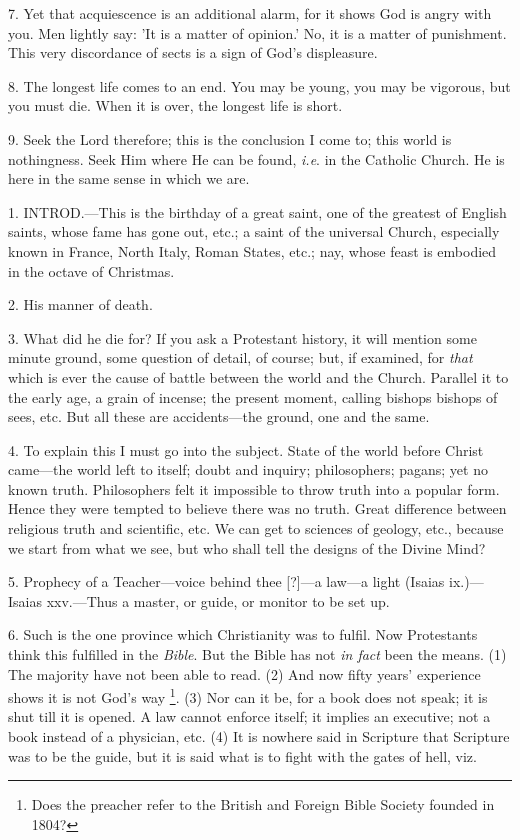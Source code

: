 7. Yet that acquiescence is an additional alarm,
for it shows God is angry with you. Men lightly say: 'It is a matter
of opinion.' No, it is a matter of punishment. This very discordance
of sects is a sign of God's displeasure.

8. The longest life comes to an end. You may be
young, you may be vigorous, but you must die. When it is over, the
longest life is short.

9. Seek the Lord therefore; this is the
conclusion I come to; this world is nothingness. Seek Him where He can
be found, \emph{i.e}. in the Catholic Church. He is here in the same
sense in which we are.


1. INTROD.—This
is the birthday of a great saint, one of the greatest of English
saints, whose fame has gone out, etc.; a saint of the universal
Church, especially known in France, North Italy, Roman States, etc.;
nay, whose feast is embodied in the octave of Christmas.

2. His manner of death.

3. What did he die for? If you ask a Protestant
history, it will mention some minute ground, some question of detail,
of course; but, if examined, for \emph{that} which is ever the cause
of battle between the world and the Church. Parallel it to the early
age, a grain of incense; the present moment, calling bishops bishops
of sees, etc. But all these are accidents—the ground, one and the
same.

4. To explain this I must go into the subject.
State of the world before Christ came—the world left to itself;
doubt and inquiry; philosophers; pagans; yet no known truth.
Philosophers felt it impossible to throw truth into a popular form.
Hence they were tempted to believe there was no truth. Great
difference between religious truth and scientific, etc. We can get to
sciences of geology, etc., because we start from what we see, but who
shall tell the designs of the Divine Mind?

5. Prophecy of a Teacher—voice behind thee
[?]—a law—a light (Isaias ix.)—Isaias xxv.—Thus a master, or
guide, or monitor to be set up.

6. Such is the one province which Christianity
was to fulfil. Now Protestants think this fulfilled in the \emph{Bible}.
But the Bible has not \emph{in fact} been the means. (1) The majority
have not been able to read. (2) And now fifty years' experience shows
it is not God's way \footnote{Does the preacher refer
to the British and Foreign Bible Society founded in 1804?}.
(3) Nor can it be, for a book does not speak; it is shut till it is
opened. A law cannot enforce itself; it implies an executive; not a
book instead of a physician, etc. (4) It is nowhere said in Scripture
that Scripture was to be the guide, but it is said what is to fight
with the gates of hell, viz.

